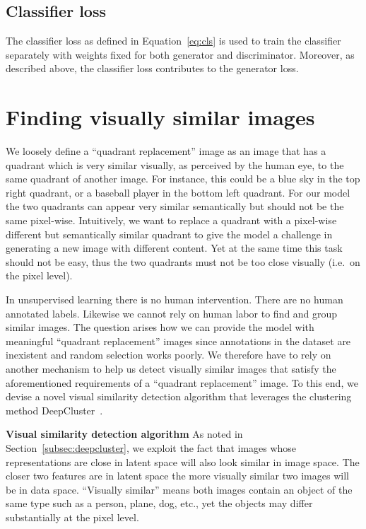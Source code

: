 \documentclass[a4paper,12pt]{report}
\begin{document}
\subsection{Classifier loss}
The classifier loss as defined in Equation~\ref{eq:cls} is used to train the classifier separately with weights fixed for both generator and discriminator. Moreover, as described above, the classifier loss contributes to the generator loss.



\section{Finding visually similar images} \label{subsec:img_clustering}
We loosely define a ``quadrant replacement'' image as an image that has a quadrant which is very similar visually, as perceived by the human eye, to the same quadrant of another image. For instance, this could be a blue sky in the top right quadrant, or a baseball player in the bottom left quadrant. For our model the two quadrants can appear very similar semantically but should not be the same pixel-wise. Intuitively, we want to replace a quadrant with a pixel-wise different but semantically similar quadrant to give the model a challenge in generating a new image with different content. Yet at the same time this task should not be easy, thus the two quadrants must not be too close visually (i.e.\ on the pixel level).

In unsupervised learning there is no human intervention. There are no human annotated labels. Likewise we cannot rely on human labor to find and group similar images. The question arises how we can provide the model with meaningful ``quadrant replacement'' images since annotations in the dataset are inexistent and random selection works poorly. We therefore have to rely on another mechanism to help us detect visually similar images that satisfy the aforementioned requirements of a ``quadrant replacement'' image. To this end, we devise a novel visual similarity detection algorithm that leverages the clustering method DeepCluster~\cite{DeepCluster}.

\textbf{Visual similarity detection algorithm} As noted in Section~\ref{subsec:deepcluster}, we exploit the fact that images whose representations are close in latent space will also look similar in image space. The closer two features are in latent space the more visually similar two images will be in data space. ``Visually similar'' means both images contain an object of the same type such as a person, plane, dog, etc., yet the objects may differ substantially at the pixel level.
\end{document}
